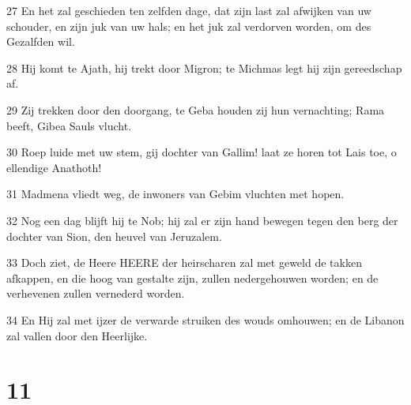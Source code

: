 \par 27 En het zal geschieden ten zelfden dage, dat zijn last zal afwijken van uw schouder, en zijn juk van uw hals; en het juk zal verdorven worden, om des Gezalfden wil.
\par 28 Hij komt te Ajath, hij trekt door Migron; te Michmas legt hij zijn gereedschap af.
\par 29 Zij trekken door den doorgang, te Geba houden zij hun vernachting; Rama beeft, Gibea Sauls vlucht.
\par 30 Roep luide met uw stem, gij dochter van Gallim! laat ze horen tot Lais toe, o ellendige Anathoth!
\par 31 Madmena vliedt weg, de inwoners van Gebim vluchten met hopen.
\par 32 Nog een dag blijft hij te Nob; hij zal er zijn hand bewegen tegen den berg der dochter van Sion, den heuvel van Jeruzalem.
\par 33 Doch ziet, de Heere HEERE der heirscharen zal met geweld de takken afkappen, en die hoog van gestalte zijn, zullen nedergehouwen worden; en de verhevenen zullen vernederd worden.
\par 34 En Hij zal met ijzer de verwarde struiken des wouds omhouwen; en de Libanon zal vallen door den Heerlijke.

\chapter{11}

